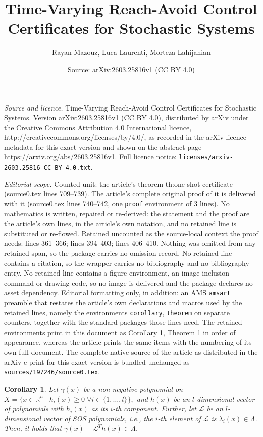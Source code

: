 \documentclass[10pt,a4paper]{amsart}
\title{Time-Varying Reach-Avoid Control Certificates for Stochastic Systems}
\author{Rayan Mazouz, Luca Laurenti, Morteza Lahijanian}
\date{Source: arXiv:2603.25816v1 (CC BY 4.0)}
\newtheorem{corollary}{Corollary}
\renewcommand{\L}{\mathcal{L}}
\newcommand{\algebraic}{X = \big \{ x \in \reals^n \mid h_i(x) \geq 0 \; \forall i \in \set{1, \ldots, l} \big \}}
\newcommand{\reals}{\mathbb{R}}
\newcommand{\set}[1]{\{#1\}}
\begin{document}
\maketitle

\noindent\emph{Source and licence.} Time-Varying Reach-Avoid Control Certificates for Stochastic Systems. Version arXiv:2603.25816v1 (CC BY 4.0), distributed by arXiv under the Creative Commons Attribution 4.0 International licence, http://creativecommons.org/licenses/by/4.0/, as recorded in the arXiv licence metadata for this exact version and shown on the abstract page https://arxiv.org/abs/2603.25816v1. Full licence notice: \texttt{licenses/arxiv-2603.25816-CC-BY-4.0.txt}.\par\smallskip

\noindent\textit{Editorial scope.} Counted unit: the article's theorem th:one-shot-certificate (source0.tex lines 709--739). The article's complete original proof of it is delivered with it (source0.tex lines 740--742, one \texttt{proof} environment of 3 lines). No mathematics is written, repaired or re-derived: the statement and the proof are the article's own lines, in the article's own notation, and no retained line is substituted or re-flowed.  Retained uncounted as the source-local context the proof needs: lines 361--366; lines 394--403; lines 406--410.  Nothing was omitted from any retained span, so the package carries no omission record.  No retained line contains a citation, so the wrapper carries no bibliography and no bibliography entry.  No retained line contains a figure environment, an image-inclusion command or drawing code, so no image is delivered and the package declares no asset dependency.  Editorial formatting only, in addition: an AMS \texttt{amsart} preamble that restates the article's own declarations and macros used by the retained lines, namely the environments \texttt{corollary}, \texttt{theorem} on separate counters, together with the standard packages those lines need.  The retained environments print in this document as Corollary 1, Theorem 1 in order of appearance, whereas the article prints the same items with the numbering of its own full document.  The complete native source of the article as distributed in the arXiv e-print for this exact version is bundled unchanged as \texttt{sources/197246/source0.tex}.
\begin{corollary}
\label{cor:sosp1}
Let $\gamma(x)$ be a non-negative polynomial on $\algebraic,$ and $h(x)$ be an $l$-dimensional vector of polynomials with $h_i(x)$ as its $i$-th component.
Further, let $\L$ be an $l$-dimensional vector of SOS polynomials, i.e., the $i$-th element of $\L$ is $\lambda_i(x) \in \Lambda$.
Then, it holds that $ \gamma(x) - \mathcal{L}^{T} h(x) \in \Lambda$.
\end{corollary}
\end{document}
